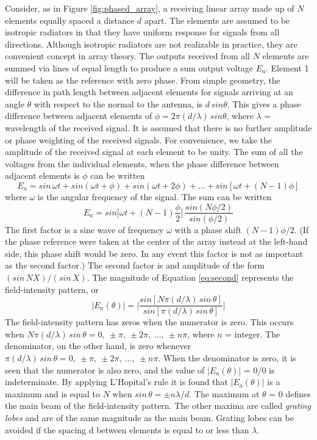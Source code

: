 \documentclass{article}
\begin{document}
Consider, as in Figure \ref{fig:phased_array}, a receiving linear array made up of $N$ elements equally spaced a distance $d$ apart. The elements are assumed to be isotropic radiators in that they have uniform response for signals from all directions. Although isotropic radiators are not realizable in practice, they are convenient concept in array theory. The outputs received from all $N$ elements are summed via lines of equal length to produce a sum output voltage $E_a$. Element 1 will be taken as the reference with zero phase. From simple geometry, the difference in path length between adjacent elements for signals arriving at an angle $\theta$ with respect to the normal to the antenna, is $d\,sin\theta$. This gives a phase difference between adjacent elements of $\phi=2\pi(d/\lambda)\,sin\theta$, where $\lambda$ = wavelength of the received signal. It is assumed that there is no further amplitude or phase weighting of the received signals. For convenience, we take the amplitude of the received signal at each element to be unity. The sum of all the voltages from the individual elements, when the phase difference between adjacent elements is $\phi$ can be written
\begin{equation}
\label{eq:first}
E_a=sin\,\omega t+sin(\omega t + \phi)+sin(\omega t + 2\phi)+...+sin[\omega t +(N-1)\phi] 
\end{equation}
where $\omega$ is the angular frequency of the signal. The sum can be written
\begin{equation}
\label{eq:second}
E_a=sin\bigg[\omega t + (N-1)\frac{\phi}{2}\bigg]\,\frac{sin(N\phi/2)}{sin(\phi/2)}
\end{equation}
The first factor is a sine wave of frequency $\omega$ with a phase shift $(N-1)\phi/2$. (If the phase reference were taken at the center of the array instead at the left-hand side, this phase shift would be zero. In any event this factor is not as important as the second factor.) The second factor is and amplitude of the form $(sin\,NX)/(sin\,X)$. The magnitude of Equation \ref{eq:second} represents the field-intensity pattern, or
\begin{equation}
\label{eq:second}
|E_a(\theta)|=\bigg|\frac{sin[N\pi(d/\lambda)\,sin\,\theta]}{sin[\pi(d/\lambda)\,sin\,\theta]}\bigg|
\end{equation}
The field-intensity pattern has zeros when the numerator is zero. This occurs when $N\pi(d/\lambda)\,sin\,\theta=0,\:\pm\pi,\:\pm 2\pi,\:...,\:\pm n\pi$, where $n$ = integer. The denominator, on the other hand, is zero whenever $\pi(d/\lambda)\,sin\,\theta=0,\:\pm\pi,\:\pm 2\pi,\:...,\:\pm n\pi$. When the denominator is zero, it is seen that the numerator is also zero, and the value of $|E_a(\theta)|$ = 0/0 is indeterminate. By applying L'Hopital's rule it is found that $|E_a(\theta)|$ is a maximum and is equal to $N$ when $sin\,\theta=\pm n\lambda/d$. The maximum at $\theta$ = 0 defines the main beam of the field-intensity pattern. The other maxima are called \emph{grating lobes} and are of the same magnitude as the main beam. Grating lobes can be avoided if the spacing d between elements is equal to or less than $\lambda$.      
\end{document}
